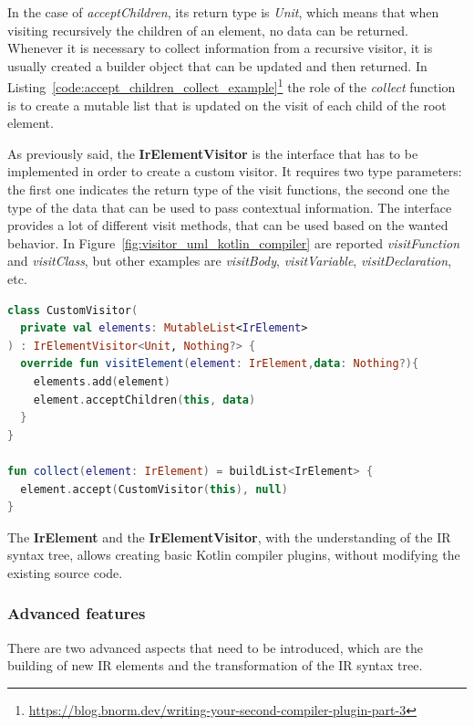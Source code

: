 In the case of \textit{acceptChildren}, its return type is \textit{Unit}, which means that when visiting recursively the children of an element, no data can be returned. Whenever it is necessary to collect information from a recursive visitor, it is usually created a builder object that can be updated and then returned. In Listing~\ref{code:accept_children_collect_example}\footnote{\url{https://blog.bnorm.dev/writing-your-second-compiler-plugin-part-3}} the role of the \textit{collect} function is to create a mutable list that is updated on the visit of each child of the root element.

As previously said, the \textbf{IrElementVisitor} is the interface that has to be implemented in order to create a custom visitor. It requires two type parameters: the first one indicates the return type of the visit functions, the second one the type of the data that can be used to pass contextual information. The interface provides a lot of different visit methods, that can be used based on the wanted behavior. In Figure~\ref{fig:visitor_uml_kotlin_compiler} are reported \textit{visitFunction} and \textit{visitClass}, but other examples are \textit{visitBody}, \textit{visitVariable}, \textit{visitDeclaration}, etc.

\begin{lstlisting}[caption={Example of a custom visitor and a function that supports the collection of elements}, captionpos=b, language=Kotlin, label={code:accept_children_collect_example}]
class CustomVisitor(
  private val elements: MutableList<IrElement>
) : IrElementVisitor<Unit, Nothing?> {
  override fun visitElement(element: IrElement,data: Nothing?){
    elements.add(element)
    element.acceptChildren(this, data)
  }
}

fun collect(element: IrElement) = buildList<IrElement> {
  element.accept(CustomVisitor(this), null)
}
\end{lstlisting}

The \textbf{IrElement} and the \textbf{IrElementVisitor}, with the understanding of the IR syntax tree, allows creating basic Kotlin compiler plugins, without modifying the existing source code.

\subsubsection{Advanced features}\label{section:compiler_plugin_advaced}
There are two advanced aspects that need to be introduced, which are the building of new IR elements and the transformation of the IR syntax tree.

